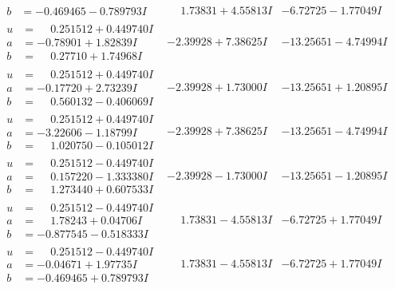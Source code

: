\documentclass[1p]{elsarticle_modified}
\theoremstyle{definition}
\begin{document}
$$\begin{array}{c|c|c}
\begin{aligned}
b &= -0.469465 - 0.789793 I\end{aligned}
 & \phantom{-}1.73831 + 4.55813 I & -6.72725 - 1.77049 I \\ \hline\begin{aligned}
u &= \phantom{-}0.251512 + 0.449740 I \\
a &= -0.78901 + 1.82839 I \\
b &= \phantom{-}0.27710 + 1.74968 I\end{aligned}
 & -2.39928 + 7.38625 I & -13.25651 - 4.74994 I \\ \hline\begin{aligned}
u &= \phantom{-}0.251512 + 0.449740 I \\
a &= -0.17720 + 2.73239 I \\
b &= \phantom{-}0.560132 - 0.406069 I\end{aligned}
 & -2.39928 + 1.73000 I & -13.25651 + 1.20895 I \\ \hline\begin{aligned}
u &= \phantom{-}0.251512 + 0.449740 I \\
a &= -3.22606 - 1.18799 I \\
b &= \phantom{-}1.020750 - 0.105012 I\end{aligned}
 & -2.39928 + 7.38625 I & -13.25651 - 4.74994 I \\ \hline\begin{aligned}
u &= \phantom{-}0.251512 - 0.449740 I \\
a &= \phantom{-}0.157220 - 1.333380 I \\
b &= \phantom{-}1.273440 + 0.607533 I\end{aligned}
 & -2.39928 - 1.73000 I & -13.25651 - 1.20895 I \\ \hline\begin{aligned}
u &= \phantom{-}0.251512 - 0.449740 I \\
a &= \phantom{-}1.78243 + 0.04706 I \\
b &= -0.877545 - 0.518333 I\end{aligned}
 & \phantom{-}1.73831 - 4.55813 I & -6.72725 + 1.77049 I \\ \hline\begin{aligned}
u &= \phantom{-}0.251512 - 0.449740 I \\
a &= -0.04671 + 1.97735 I \\
b &= -0.469465 + 0.789793 I\end{aligned}
 & \phantom{-}1.73831 - 4.55813 I & -6.72725 + 1.77049 I \\ \hline\begin{aligned}

\end{aligned}
\end{array}$$
\end{document}
